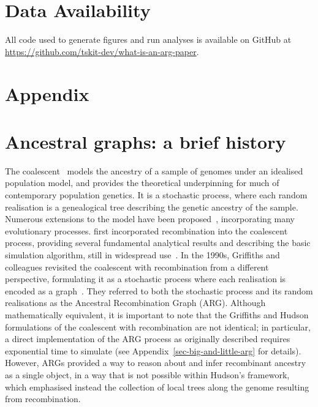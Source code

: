 \documentclass{article}
\begin{document}
\section*{Data Availability}
All code used to generate figures and run analyses is available on GitHub at
\url{https://github.com/tskit-dev/what-is-an-arg-paper}.




\setcounter{secnumdepth}{2} %

\section*{Appendix}
\appendix


\setcounter{table}{0}
\setcounter{figure}{0}
\renewcommand{\thetable}{A\arabic{table}}
\renewcommand{\thefigure}{A\arabic{figure}}

\section{Ancestral graphs: a brief history}
\label{sec-arg-history}
The coalescent~\citep{kingman1982coalescent,kingman1982genealogy,
hudson1983testing, tajima1983evolutionary} models the ancestry of a sample of
genomes under an idealised population model, and provides the theoretical
underpinning for much of contemporary population genetics.
It is a stochastic process, where each random realisation
is a genealogical tree describing the genetic ancestry of the sample.
Numerous extensions to the model have been
proposed~\citep{hudson1990gene,hein2004gene,wakely2008coalescent},
incorporating many evolutionary processes.
\citet{hudson1983properties}
first incorporated recombination into the coalescent process,
providing several fundamental analytical results
and describing the basic simulation algorithm, still in
widespread use~\citep{hudson2002generating,kelleher2016efficient,
kelleher2020coalescent,baumdicker2021efficient}.
In the 1990s, Griffiths and colleagues revisited the
coalescent with recombination from a different perspective,
formulating it as a stochastic process where each realisation
is encoded as a graph~\citep{griffiths1991two,ethier1990two,
griffiths1996ancestral,griffiths1997ancestral}.
They referred to both the stochastic process and
its random realisations as the Ancestral Recombination Graph (ARG).
Although mathematically equivalent, it is
important to note that the Griffiths and Hudson formulations of
the coalescent with recombination are not identical;
in particular, a direct implementation of the ARG process
as originally described requires exponential time to simulate
(see Appendix~\ref{sec-big-and-little-arg} for details).
However, ARGs provided a way
to reason about and infer recombinant ancestry as a single object,
in a way that is not possible within Hudson's framework, which emphasised
instead the collection of local trees along the genome
resulting from recombination.
\end{document}

